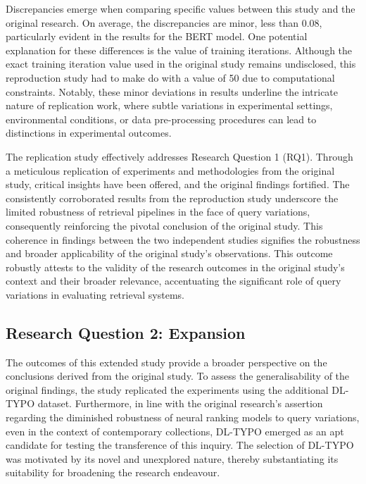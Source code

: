 Discrepancies emerge when comparing specific values between this study and the original research. On average, the discrepancies are minor, less than 0.08, particularly evident in the results for the BERT model. One potential explanation for these differences is the value of training iterations. Although the exact training iteration value used in the original study remains undisclosed, this reproduction study had to make do with a value of 50 due to computational constraints. Notably, these minor deviations in results underline the intricate nature of replication work, where subtle variations in experimental settings, environmental conditions, or data pre-processing procedures can lead to distinctions in experimental outcomes.

The replication study effectively addresses Research Question 1 (RQ1). Through a meticulous replication of experiments and methodologies from the original study, critical insights have been offered, and the original findings fortified. The consistently corroborated results from the reproduction study underscore the limited robustness of retrieval pipelines in the face of query variations, consequently reinforcing the pivotal conclusion of the original study. This coherence in findings between the two independent studies signifies the robustness and broader applicability of the original study's observations. This outcome robustly attests to the validity of the research outcomes in the original study's context and their broader relevance, accentuating the significant role of query variations in evaluating retrieval systems.

\subsection{Research Question 2: Expansion}
The outcomes of this extended study provide a broader perspective on the conclusions derived from the original study. To assess the generalisability of the original findings, the study replicated the experiments using the additional DL-TYPO dataset. Furthermore, in line with the original research's assertion regarding the diminished robustness of neural ranking models to query variations, even in the context of contemporary collections, DL-TYPO emerged as an apt candidate for testing the transference of this inquiry. The selection of DL-TYPO was motivated by its novel and unexplored nature, thereby substantiating its suitability for broadening the research endeavour.



